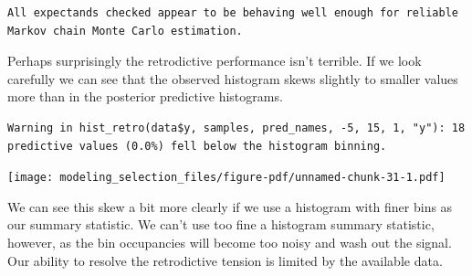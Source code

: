 \documentclass[
  letterpaper,
  DIV=11,
  numbers=noendperiod]{scrartcl}
\newenvironment{Shaded}{\begin{snugshade}}{\end{snugshade}}
\newcommand{\AttributeTok}[1]{\textcolor[rgb]{0.40,0.45,0.13}{#1}}
\newcommand{\ConstantTok}[1]{\textcolor[rgb]{0.56,0.35,0.01}{#1}}
\newcommand{\DecValTok}[1]{\textcolor[rgb]{0.68,0.00,0.00}{#1}}
\newcommand{\FloatTok}[1]{\textcolor[rgb]{0.68,0.00,0.00}{#1}}
\newcommand{\FunctionTok}[1]{\textcolor[rgb]{0.28,0.35,0.67}{#1}}
\newcommand{\NormalTok}[1]{\textcolor[rgb]{0.00,0.23,0.31}{#1}}
\newcommand{\OtherTok}[1]{\textcolor[rgb]{0.00,0.23,0.31}{#1}}
\newcommand{\SpecialCharTok}[1]{\textcolor[rgb]{0.37,0.37,0.37}{#1}}
\newcommand{\StringTok}[1]{\textcolor[rgb]{0.13,0.47,0.30}{#1}}
\begin{document}
\begin{verbatim}
All expectands checked appear to be behaving well enough for reliable
Markov chain Monte Carlo estimation.
\end{verbatim}

Perhaps surprisingly the retrodictive performance isn't terrible. If we
look carefully we can see that the observed histogram skews slightly to
smaller values more than in the posterior predictive histograms.

\begin{Shaded}
\end{Shaded}

\begin{verbatim}
Warning in hist_retro(data$y, samples, pred_names, -5, 15, 1, "y"): 18
predictive values (0.0%) fell below the histogram binning.
\end{verbatim}

\texttt{[image: modeling\_selection\_files/figure-pdf/unnamed-chunk-31-1.pdf]}

We can see this skew a bit more clearly if we use a histogram with finer
bins as our summary statistic. We can't use too fine a histogram summary
statistic, however, as the bin occupancies will become too noisy and
wash out the signal. Our ability to resolve the retrodictive tension is
limited by the available data.

\begin{Shaded}
\end{Shaded}
\end{document}
